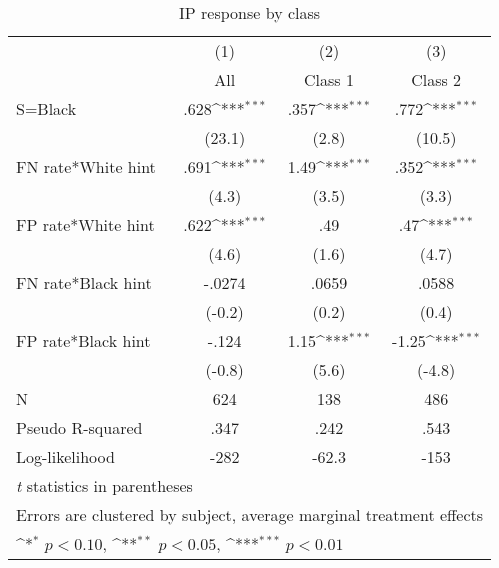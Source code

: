 \begin{table}[htbp]\centering
\def\sym#1{\ifmmode^{#1}\else\(^{#1}\)\fi}
\caption{IP response by class}
\begin{tabular}{l*{3}{c}}
\hline\hline
                &\multicolumn{1}{c}{(1)}&\multicolumn{1}{c}{(2)}&\multicolumn{1}{c}{(3)}\\
                &\multicolumn{1}{c}{All}&\multicolumn{1}{c}{Class 1}&\multicolumn{1}{c}{Class 2}\\
\hline
S=Black         &     .628\sym{***}&     .357\sym{***}&     .772\sym{***}\\
                &   (23.1)         &    (2.8)         &   (10.5)         \\
FN rate*White hint&     .691\sym{***}&     1.49\sym{***}&     .352\sym{***}\\
                &    (4.3)         &    (3.5)         &    (3.3)         \\
FP rate*White hint&     .622\sym{***}&      .49         &      .47\sym{***}\\
                &    (4.6)         &    (1.6)         &    (4.7)         \\
FN rate*Black hint&   -.0274         &    .0659         &    .0588         \\
                &   (-0.2)         &    (0.2)         &    (0.4)         \\
FP rate*Black hint&    -.124         &     1.15\sym{***}&    -1.25\sym{***}\\
                &   (-0.8)         &    (5.6)         &   (-4.8)         \\
\hline
N               &      624         &      138         &      486         \\
Pseudo R-squared&     .347         &     .242         &     .543         \\
Log-likelihood  &     -282         &    -62.3         &     -153         \\
\hline\hline
\multicolumn{4}{l}{\footnotesize \textit{t} statistics in parentheses}\\
\multicolumn{4}{l}{\footnotesize Errors are clustered by subject, average marginal treatment effects}\\
\multicolumn{4}{l}{\footnotesize \sym{*} \(p<0.10\), \sym{**} \(p<0.05\), \sym{***} \(p<0.01\)}\\
\end{tabular}
\end{table}
